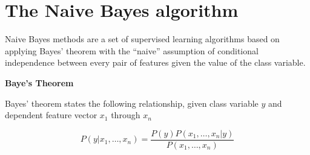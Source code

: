 \section{The Naive Bayes algorithm}
\label{naive_bayes_algo}

Naive Bayes methods are a set of supervised learning algorithms based on applying Bayes’ theorem with the “naive” assumption of conditional independence between every pair of features given the value of the class variable.


\begin{framed}
\theoremstyle{remark}
\begin{remark}{\textbf{Baye's Theorem}}

Bayes’ theorem states the following relationship, given class variable $y$ and dependent feature vector 
$x_1$ through $x_n$

\begin{equation}
P(y | x_1, \ldots , x_n ) = \frac{P(y)P(x_1, \ldots, x_n|y)}{P(x_1, \ldots, x_n)}
\end{equation}

\end{remark}
\end{framed}


